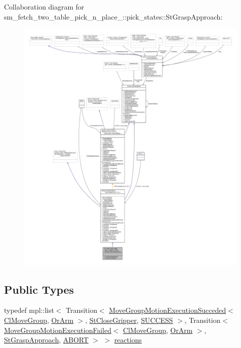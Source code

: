 Collaboration diagram for sm\+\_\+fetch\+\_\+two\+\_\+table\+\_\+pick\+\_\+n\+\_\+place\+\_\+:\+:pick\+\_\+states\+:\+:St\+Grasp\+Approach\+:
\nopagebreak
\begin{figure}[H]
\begin{center}
\leavevmode
\includegraphics[width=350pt]{structsm__fetch__two__table__pick__n__place__1_1_1pick__states_1_1StGraspApproach__coll__graph}
\end{center}
\end{figure}
\subsection*{Public Types}
\begin{DoxyCompactItemize}
\item 
typedef mpl\+::list$<$ Transition$<$ \hyperlink{structcl__move__group__interface_1_1MoveGroupMotionExecutionSucceded}{Move\+Group\+Motion\+Execution\+Succeded}$<$ \hyperlink{classcl__move__group__interface_1_1ClMoveGroup}{Cl\+Move\+Group}, \hyperlink{classsm__fetch__two__table__pick__n__place__1_1_1OrArm}{Or\+Arm} $>$, \hyperlink{structsm__fetch__two__table__pick__n__place__1_1_1pick__states_1_1StCloseGripper}{St\+Close\+Gripper}, \hyperlink{classSUCCESS}{S\+U\+C\+C\+E\+SS} $>$, Transition$<$ \hyperlink{structcl__move__group__interface_1_1MoveGroupMotionExecutionFailed}{Move\+Group\+Motion\+Execution\+Failed}$<$ \hyperlink{classcl__move__group__interface_1_1ClMoveGroup}{Cl\+Move\+Group}, \hyperlink{classsm__fetch__two__table__pick__n__place__1_1_1OrArm}{Or\+Arm} $>$, \hyperlink{structsm__fetch__two__table__pick__n__place__1_1_1pick__states_1_1StGraspApproach}{St\+Grasp\+Approach}, \hyperlink{classABORT}{A\+B\+O\+RT} $>$ $>$ \hyperlink{structsm__fetch__two__table__pick__n__place__1_1_1pick__states_1_1StGraspApproach_a1ad3c3b9bf4375e58d4431b999b8390f}{reactions}
\end{DoxyCompactItemize}
